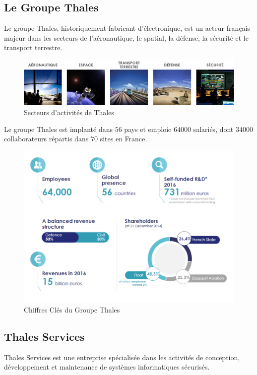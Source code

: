 \documentclass[a4paper, 11pt]{report}
\begin{document}
\subsection{Le Groupe Thales}
Le groupe Thales, historiquement fabricant d'électronique, est un acteur français majeur dans les secteurs de l'aéronautique, le spatial, la défense, la sécurité et le transport terrestre.
\begin{figure}[H]
	\centering
	\includegraphics[scale=0.5]{Images/Secteurs_Activites.png}
	\caption{Secteurs d'activités de Thales}
\end{figure}
Le groupe Thales est implanté dans $56$ pays et emploie $64000$ salariés, dont $34000$ collaborateurs répartis dans $70$ sites en France.
\begin{figure}[H]
	\centering
	\includegraphics[scale=0.5]{Images/Chiffres_Cles.png}
	\caption{Chiffres Clés du Groupe Thales}
\end{figure}
\subsection{Thales Services}
Thales Services est une entreprise spécialisée dans les activités de conception, développement et maintenance de systèmes informatiques sécurisés.
\end{document}
